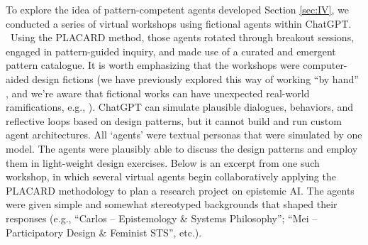 \documentclass[acmlarge,timestamp]{acmart}
\begin{document}
{To explore the idea of pattern-competent agents developed Section \ref{sec:IV}, we conducted a series of virtual workshops using fictional agents within ChatGPT. ~Using the PLACARD method, those agents rotated through breakout sessions, engaged in pattern-guided inquiry, and made use of a curated and emergent pattern catalogue.  It is worth emphasizing that the workshops were computer-aided design fictions (we have previously explored this way of working “by hand” \cite{fictional-peeragogical}, and we’re aware that fictional works can have unexpected real-world ramifications, e.g., \cite{enwiki:1290575156}).  ChatGPT can simulate plausible dialogues, behaviors, and reflective loops based on design patterns, but it cannot build and run custom agent architectures.  All `agents' were textual personas that were simulated by one model.  The agents were plausibly able to discuss the design patterns and employ them in light-weight design exercises.  Below is an excerpt from one such workshop,
in which several virtual agents begin collaboratively applying the PLACARD methodology to plan a research project on epistemic AI.  The agents were given simple and somewhat stereotyped backgrounds that shaped their responses (e.g., “Carlos – Epistemology \& Systems Philosophy”; “Mei – Participatory Design \& Feminist STS”, etc.).
\smallskip

}
\end{document}

